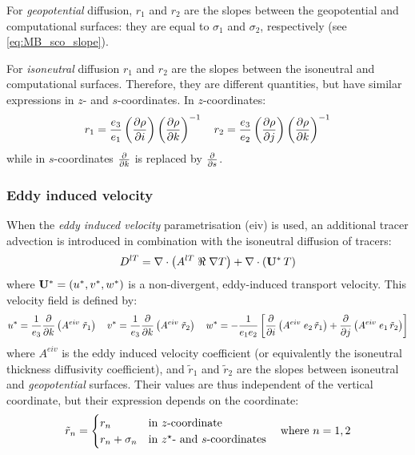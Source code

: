 \documentclass[../main/NEMO_manual]{subfiles}
\begin{document}
For \textit{geopotential} diffusion,
$r_1$ and $r_2 $ are the slopes between the geopotential and computational surfaces:
they are equal to $\sigma_1$ and $\sigma_2$, respectively (see \autoref{eq:MB_sco_slope}).

For \textit{isoneutral} diffusion $r_1$ and $r_2$ are the slopes between
the isoneutral and computational surfaces.
Therefore, they are different quantities, but have similar expressions in $z$- and $s$-coordinates.
In $z$-coordinates:
\begin{equation}
  \label{eq:MB_iso_slopes}
  r_1 = \frac{e_3}{e_1} \lt( \pd[\rho]{i} \rt) \lt( \pd[\rho]{k} \rt)^{-1} \quad
  r_2 = \frac{e_3}{e_2} \lt( \pd[\rho]{j} \rt) \lt( \pd[\rho]{k} \rt)^{-1}
\end{equation}
while in $s$-coordinates $\pd[]{k}$ is replaced by $\pd[]{s}$.

\subsubsection{Eddy induced velocity}

When the \textit{eddy induced velocity} parametrisation (eiv) \citep{gent.mcwilliams_JPO90} is used,
an additional tracer advection is introduced in combination with the isoneutral diffusion of tracers:
\[
  D^{lT} = \nabla \cdot \lt( A^{lT} \; \Re \; \nabla T \rt) + \nabla \cdot \lt( \vect U^\ast \, T \rt)
\]
where $ \vect U^\ast = \lt( u^\ast,v^\ast,w^\ast \rt)$ is a non-divergent,
eddy-induced transport velocity. This velocity field is defined by:
\[
  u^\ast =   \frac{1}{e_3}            \pd[]{k} \lt( A^{eiv} \;        \tilde{r}_1 \rt) \quad
  v^\ast =   \frac{1}{e_3}            \pd[]{k} \lt( A^{eiv} \;        \tilde{r}_2 \rt) \quad
  w^\ast = - \frac{1}{e_1 e_2} \lt[   \pd[]{i} \lt( A^{eiv} \; e_2 \, \tilde{r}_1 \rt)
                                     + \pd[]{j} \lt( A^{eiv} \; e_1 \, \tilde{r}_2 \rt) \rt]
\]
where $A^{eiv}$ is the eddy induced velocity coefficient
(or equivalently the isoneutral thickness diffusivity coefficient),
and $\tilde r_1$ and $\tilde r_2$ are the slopes between
isoneutral and \textit{geopotential} surfaces.
Their values are thus independent of the vertical coordinate,
but their expression depends on the coordinate:
\begin{equation}
  \label{eq:MB_slopes_eiv}
  \tilde{r}_n =
    \begin{cases}
      r_n            & \text{in $z$-coordinate}                \\
      r_n + \sigma_n & \text{in \zstar- and $s$-coordinates}
    \end{cases}
  \quad \text{where~} n = 1, 2
\end{equation}
\end{document}
